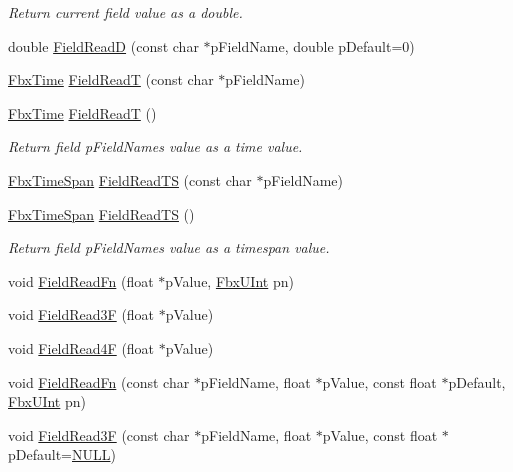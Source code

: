 \begin{Indent}
\begin{DoxyCompactItemize}
\begin{DoxyCompactList}\small\item\em Return current field value as a double. \end{DoxyCompactList}\item 
double \hyperlink{class_fbx_i_o_ae5c544d1abe78f6bab1d6e936ded755c}{Field\+ReadD} (const char $\ast$p\+Field\+Name, double p\+Default=0)
\item 
\hyperlink{class_fbx_time}{Fbx\+Time} \hyperlink{class_fbx_i_o_af8f95ac6ee44a53c4a97b917308d5eb2}{Field\+ReadT} (const char $\ast$p\+Field\+Name)
\item 
\hyperlink{class_fbx_time}{Fbx\+Time} \hyperlink{class_fbx_i_o_a5049f61b4999e2e9d87b2117380e9bb9}{Field\+ReadT} ()
\begin{DoxyCompactList}\small\item\em Return field p\+Field\+Name\textquotesingle{}s value as a time value. \end{DoxyCompactList}\item 
\hyperlink{class_fbx_time_span}{Fbx\+Time\+Span} \hyperlink{class_fbx_i_o_a5abfaea0db51831505d56f5376ea3b9e}{Field\+Read\+TS} (const char $\ast$p\+Field\+Name)
\item 
\hyperlink{class_fbx_time_span}{Fbx\+Time\+Span} \hyperlink{class_fbx_i_o_a979481e8ecba4c51413e3e7db53298da}{Field\+Read\+TS} ()
\begin{DoxyCompactList}\small\item\em Return field p\+Field\+Name\textquotesingle{}s value as a timespan value. \end{DoxyCompactList}\item 
void \hyperlink{class_fbx_i_o_ab546c7e72a06e2f2c37f59bc9e273492}{Field\+Read\+Fn} (float $\ast$p\+Value, \hyperlink{fbxtypes_8h_ae9fb141d8158a730aa85ec5ff2ea3f6b}{Fbx\+U\+Int} pn)
\item 
void \hyperlink{class_fbx_i_o_ab2ae34635c452f3619d5bbf2549e1604}{Field\+Read3F} (float $\ast$p\+Value)
\item 
void \hyperlink{class_fbx_i_o_a13890856aaca97aca7c481e8fb3a2867}{Field\+Read4F} (float $\ast$p\+Value)
\item 
void \hyperlink{class_fbx_i_o_a38983e625792b5f4b660c1fc812fd216}{Field\+Read\+Fn} (const char $\ast$p\+Field\+Name, float $\ast$p\+Value, const float $\ast$p\+Default, \hyperlink{fbxtypes_8h_ae9fb141d8158a730aa85ec5ff2ea3f6b}{Fbx\+U\+Int} pn)
\item 
void \hyperlink{class_fbx_i_o_aa7d868cff8581e401652fd7ae08da3bc}{Field\+Read3F} (const char $\ast$p\+Field\+Name, float $\ast$p\+Value, const float $\ast$p\+Default=\hyperlink{fbxarch_8h_a070d2ce7b6bb7e5c05602aa8c308d0c4}{N\+U\+LL})

\end{DoxyCompactItemize}
\end{Indent}
